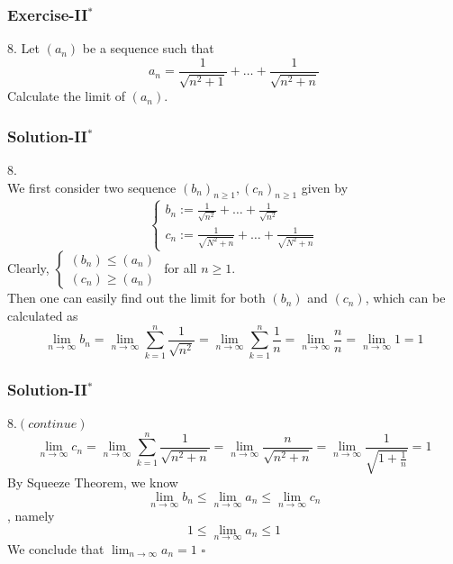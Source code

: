 \documentclass[12pt, t]{beamer}
\newcommand{\myqed}{\hfill$\square$}
\begin{document}
\begin{frame}
    \frametitle{Exercise-II$^*$}
    8. Let $(a_n)$ be a sequence such that
    \begin{equation*}
        a_n=\frac{1}{\sqrt{n^2+1}}+\dots+\frac{1}{\sqrt{n^2+n}}
    \end{equation*}
    Calculate the limit of $(a_n)$.
\end{frame}

\begin{frame}
    \frametitle{Solution-II$^*$}
    8.\\
    \hspace{1em} We first consider two sequence $(b_n)_{n\geq 1},(c_n)_{n\geq 1}$ given by
    \begin{equation*}
        \begin{cases}
            b_n:=\frac{1}{\sqrt{n^2}}+\dots+\frac{1}{\sqrt{n^2}} \\
            c_n:=\frac{1}{\sqrt{N^2+n}}+\dots+\frac{1}{\sqrt{N^2+n}}
        \end{cases}
    \end{equation*}
    \hspace{1em} Clearly,
    $\begin{cases}
            (b_n)\leq (a_n) \\
            (c_n)\geq (a_n)
        \end{cases}$
    for all $n\geq 1$. \\
    \hspace{1em} Then one can easily find out the limit for both $(b_n)$ and $(c_n)$, which can be calculated as
    \begin{equation*}
        \lim_{n\rightarrow\infty}b_n=\lim_{n\rightarrow \infty}\sum^n_{k=1}\frac{1}{\sqrt{n^2}}=\lim_{n\rightarrow \infty}\sum^n_{k=1}\frac{1}{n}=\lim_{n\rightarrow\infty}\frac{n}{n}=\lim_{n\rightarrow\infty}1=1
    \end{equation*}
\end{frame}

\begin{frame}
    \frametitle{Solution-II$^*$}
    8.$(continue)$\\
    \begin{equation*}
        \lim_{n\rightarrow\infty}c_n=\lim_{n\rightarrow \infty}\sum^n_{k=1}\frac{1}{\sqrt{n^2+n}}=\lim_{n\rightarrow \infty}\frac{n}{\sqrt{n^2+n}}=\lim_{n\rightarrow\infty}\frac{1}{\sqrt{1+\frac{1}{n}}}=1
    \end{equation*}
    \hspace{1em} By Squeeze Theorem, we know
    \begin{equation*}
        \lim_{n\rightarrow\infty}b_n\leq \lim_{n\rightarrow\infty}a_n\leq \lim_{n\rightarrow\infty}c_n
    \end{equation*}
    , namely
    \begin{equation*}
        1\leq \lim_{n\rightarrow\infty}a_n\leq1
    \end{equation*}
    We conclude that $ \lim_{n\rightarrow\infty}a_n=1$
    \myqed
\end{frame}
\end{document}
